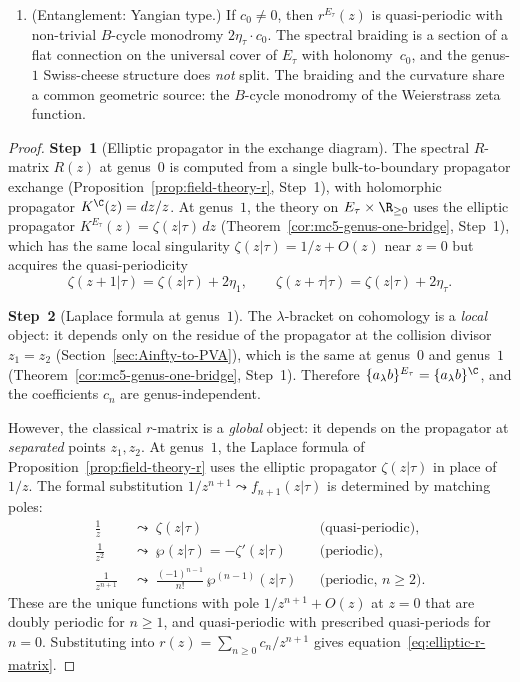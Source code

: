 \begin{theorem}
\begin{enumerate}[label=\textup{(\alph*)}]
\item \label{item:dichotomy-entanglement}
\textup{(Entanglement: Yangian type.)}
If $c_0 \ne 0$, then $r^{E_\tau}(z)$ is quasi-periodic with
non-trivial $B$-cycle monodromy $2\eta_\tau \cdot c_0$. The
spectral braiding is a section of a flat connection on the universal
cover of $E_\tau$ with holonomy~$c_0$, and the genus-$1$
Swiss-cheese structure does \emph{not} split.
The braiding and the curvature share a common geometric source:
the $B$-cycle monodromy of the Weierstrass zeta function.
\end{enumerate}
\end{theorem}

\begin{proof}
\textbf{Step~1} (Elliptic propagator in the exchange diagram).
The spectral $R$-matrix $R(z)$ at genus~$0$ is computed from
a single bulk-to-boundary propagator exchange
(Proposition~\ref{prop:field-theory-r}, Step~1), with
holomorphic propagator $K^{\C}(z) = dz/z$. At genus~$1$,
the theory on $E_\tau \times \R_{\ge 0}$ uses the elliptic
propagator
$K^{E_\tau}(z) = \zeta(z|\tau)\,dz$
(Theorem~\ref{cor:mc5-genus-one-bridge}, Step~1), which has
the same local singularity
$\zeta(z|\tau) = 1/z + O(z)$ near $z = 0$
but acquires the quasi-periodicity
\[
\zeta(z + 1|\tau) = \zeta(z|\tau) + 2\eta_1,
\qquad
\zeta(z + \tau|\tau) = \zeta(z|\tau) + 2\eta_\tau.
\]

\textbf{Step~2} (Laplace formula at genus~$1$).
The $\lambda$-bracket on cohomology is a \emph{local} object:
it depends only on the residue of the propagator at the
collision divisor $z_1 = z_2$
(Section~\ref{sec:Ainfty-to-PVA}), which is the same at
genus~$0$ and genus~$1$
(Theorem~\ref{cor:mc5-genus-one-bridge}, Step~1). Therefore
$\{a {}_\lambda b\}^{E_\tau} = \{a {}_\lambda b\}^{\C}$,
and the coefficients $c_n$ are genus-independent.

However, the classical $r$-matrix is a \emph{global} object:
it depends on the propagator at \emph{separated} points
$z_1, z_2$. At genus~$1$, the Laplace formula of
Proposition~\ref{prop:field-theory-r} uses the elliptic
propagator $\zeta(z|\tau)$ in place of $1/z$. The formal
substitution $1/z^{n+1} \leadsto f_{n+1}(z|\tau)$ is
determined by matching poles:
\begin{align*}
\frac{1}{z}
 &\;\leadsto\;
 \zeta(z|\tau)
 &&\text{(quasi-periodic)}, \\
\frac{1}{z^2}
 &\;\leadsto\;
 \wp(z|\tau) = -\zeta'(z|\tau)
 &&\text{(periodic)}, \\
\frac{1}{z^{n+1}}
 &\;\leadsto\;
 \frac{(-1)^{n-1}}{n!}\,\wp^{(n-1)}(z|\tau)
 &&\text{(periodic, $n \ge 2$)}.
\end{align*}
These are the unique functions with pole $1/z^{n+1} + O(z)$ at
$z = 0$ that are doubly periodic for $n \ge 1$, and
quasi-periodic with prescribed quasi-periods for $n = 0$.
Substituting into $r(z) = \sum_{n \ge 0} c_n / z^{n+1}$
gives equation~\eqref{eq:elliptic-r-matrix}.


\end{proof}
